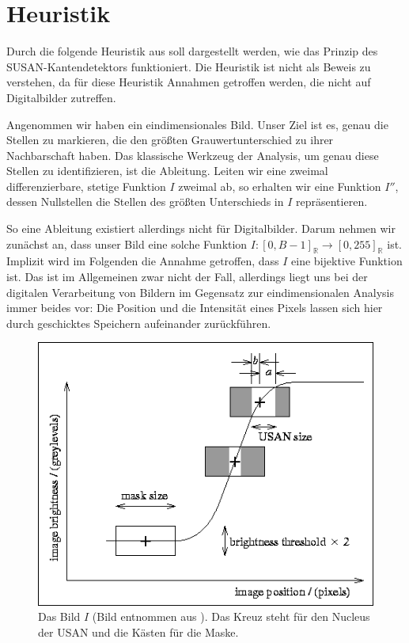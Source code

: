 \documentclass[a4paper, 11pt]{report}
\theoremstyle{definition}
\begin{document}
		\section{Heuristik}\label{sec:heuristic}
			 	Durch die folgende Heuristik aus \cite{SUSAN} soll dargestellt werden, wie das Prinzip des SUSAN-Kantendetektors funktioniert. Die Heuristik ist nicht als Beweis zu verstehen, da für diese Heuristik Annahmen getroffen werden, die nicht auf Digitalbilder zutreffen.

			 	Angenommen wir haben ein eindimensionales Bild. Unser Ziel ist es, genau die Stellen zu markieren, die den größten Grauwertunterschied zu ihrer Nachbarschaft haben. Das klassische Werkzeug der Analysis, um genau diese Stellen zu identifizieren, ist die Ableitung. Leiten wir eine zweimal differenzierbare, stetige Funktion $I$ zweimal ab, so erhalten wir eine Funktion $I''$, dessen Nullstellen die Stellen des größten Unterschieds in $I$ repräsentieren.

			 	So eine Ableitung existiert allerdings nicht für Digitalbilder. Darum nehmen wir zunächst an, dass unser Bild eine solche Funktion $I: [0, B-1]_\mathbb{R} \to [0,255]_\mathbb{R}$ ist. Implizit wird im Folgenden die Annahme getroffen, dass $I$ eine bijektive Funktion ist. Das ist im Allgemeinen zwar nicht der Fall, allerdings liegt uns bei der digitalen Verarbeitung von Bildern im Gegensatz zur eindimensionalen Analysis immer beides vor: Die Position und die Intensität eines Pixels lassen sich hier durch geschicktes Speichern aufeinander zurückführen.

			 	\begin{figure}[H]
			 		\centering
			 		\includegraphics[width=.7\textwidth]{assets/susan-graph.png}
			 		\caption{Das Bild $I$ (Bild entnommen aus \cite{SUSAN}). Das Kreuz steht für den Nucleus der USAN und die Kästen für die Maske.}
			 		\label{fig:susan-graph}
			 	\end{figure}
\end{document}
